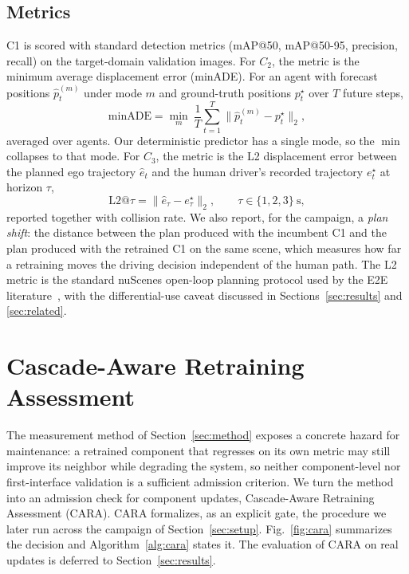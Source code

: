\documentclass[conference]{IEEEtran}
\begin{document}
\subsection{Metrics}
C1 is scored with standard detection metrics (mAP@50, mAP@50-95, precision,
recall) on the target-domain validation images. For $C_2$, the metric is the
minimum average displacement error (minADE). For an agent with forecast
positions $\hat{p}^{(m)}_{t}$ under mode $m$ and ground-truth positions
$p^{\star}_{t}$ over $T$ future steps,
\begin{equation}
\mathrm{minADE} = \min_{m}\ \frac{1}{T}\sum_{t=1}^{T}
\bigl\lVert \hat{p}^{(m)}_{t} - p^{\star}_{t} \bigr\rVert_2 ,
\label{eq:minade}
\end{equation}
averaged over agents. Our deterministic predictor has a single mode, so the
$\min$ collapses to that mode. For $C_3$, the metric is the L2 displacement
error between the planned ego trajectory $\hat{e}_t$ and the human driver's
recorded trajectory $e^{\star}_t$ at horizon $\tau$,
\begin{equation}
\mathrm{L2}@\tau = \bigl\lVert \hat{e}_{\tau} - e^{\star}_{\tau} \bigr\rVert_2 ,
\qquad \tau \in \{1,2,3\}\ \text{s},
\label{eq:l2}
\end{equation}
reported together with collision rate. We also report, for the campaign, a
\emph{plan shift}: the distance between the plan produced with the incumbent C1
and the plan produced with the retrained C1 on the same scene, which measures
how far a retraining moves the driving decision independent of the human path.
The L2 metric is the standard nuScenes open-loop planning protocol used by the
E2E literature~\cite{hu2023uniad,jiang2023vad,zhai2023rethinking}, with the
differential-use caveat discussed in Sections~\ref{sec:results} and
\ref{sec:related}.

\section{Cascade-Aware Retraining Assessment}
\label{sec:cara}
The measurement method of Section~\ref{sec:method} exposes a concrete hazard for
maintenance: a retrained component that regresses on its own metric may still
improve its neighbor while degrading the system, so neither component-level nor
first-interface validation is a sufficient admission criterion. We turn the
method into an admission check for component updates, Cascade-Aware Retraining
Assessment (CARA). CARA formalizes, as an explicit gate, the procedure we later
run across the campaign of Section~\ref{sec:setup}. Fig.~\ref{fig:cara}
summarizes the decision and Algorithm~\ref{alg:cara} states it. The evaluation of
CARA on real updates is deferred to Section~\ref{sec:results}.
\end{document}
